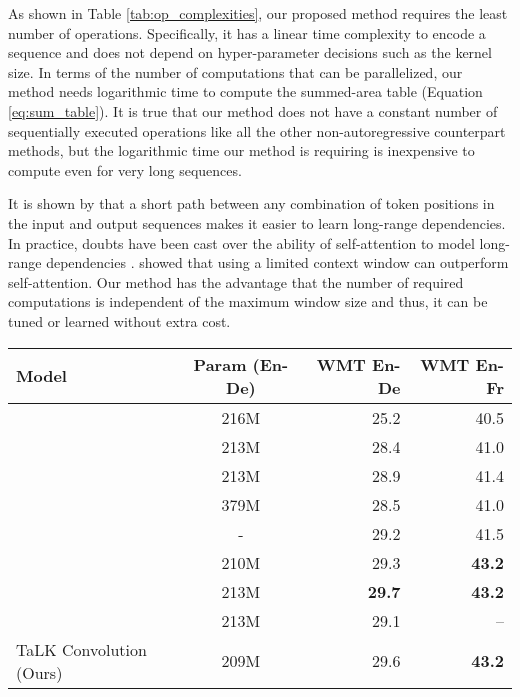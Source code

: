 \documentclass{article}
\def\talkconvfull{TaLK Convolution}
\def\ende{WMT En-De}
\def\enfr{WMT En-Fr}
\begin{document}
As shown in Table \ref{tab:op_complexities}, our proposed method requires the least number of operations. Specifically, it has a linear time complexity to encode a sequence and does not depend on hyper-parameter decisions such as the kernel size. In terms of the number of computations that can be parallelized, our method needs logarithmic time to compute the summed-area table (Equation \ref{eq:sum_table}). It is true that our method does not have a constant number of sequentially executed operations like all the other non-autoregressive counterpart methods, but the logarithmic time our method is requiring is inexpensive to compute even for very long sequences. 

It is shown by \citet{5264952} that a short path between any combination of token positions in the input and output sequences makes it easier to learn long-range dependencies. In practice, doubts have been cast over the ability of self-attention to model long-range dependencies \cite{DBLP:journals/corr/abs-1808-08946,wu2019pay}. \citet{wu2019pay} showed that using a limited context window can outperform self-attention. Our method has the advantage that the number of required computations is independent of the maximum window size and thus, it can be tuned or learned without extra cost. 

\begin{table*}[t]
\centering
\caption{Machine translation accuracy in terms of BLEU for \ende{} and \enfr{} on newstest2014.}
\vskip 0.15in
\begin{tabular}{lcrr}
\toprule
Model & Param (En-De) & \ende{} & \enfr{} \\
\midrule
\citet{gehring2017convolutional} & 216M & 25.2 & 40.5 \\
\citet{vaswani2017attention} & 213M & 28.4 & 41.0 \\
\citet{DBLP:journals/corr/abs-1711-02132} & 213M & 28.9 & 41.4 \\
\citet{DBLP:journals/corr/abs-1804-09849} & 379M & 28.5 & 41.0 \\
\citet{DBLP:journals/corr/abs-1803-02155}  & - & 29.2 & 41.5 \\
\citet{DBLP:journals/corr/abs-1806-00187} & 210M & 29.3 & \textbf{43.2} \\
\citet{wu2019pay} & 213M & \textbf{29.7} & \textbf{43.2} \\
\citet{kitaev2020reformer} & 213M & {29.1} & -- \\
\midrule
\talkconvfull{} (Ours) & 209M & 29.6 & \textbf{43.2} \\
\bottomrule
\end{tabular}
\label{tab:mt1}
\end{table*}
\end{document}
